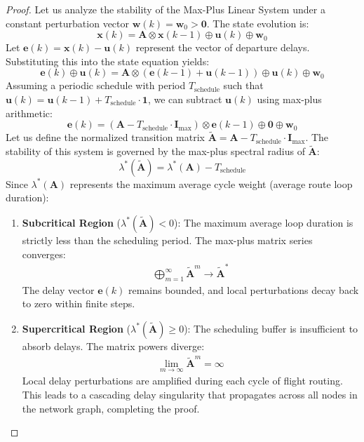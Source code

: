 \documentclass[11pt,a4paper]{book}
\begin{document}
\begin{proof}
Let us analyze the stability of the Max-Plus Linear System under a constant perturbation vector $\mathbf{w}(k) = \mathbf{w}_0 > \mathbf{0}$. The state evolution is:
\begin{equation}
\mathbf{x}(k) = \mathbf{A} \otimes \mathbf{x}(k-1) \oplus \mathbf{u}(k) \oplus \mathbf{w}_0
\end{equation}
Let $\mathbf{e}(k) = \mathbf{x}(k) - \mathbf{u}(k)$ represent the vector of departure delays. Substituting this into the state equation yields:
\begin{equation}
\mathbf{e}(k) \oplus \mathbf{u}(k) = \mathbf{A} \otimes (\mathbf{e}(k-1) + \mathbf{u}(k-1)) \oplus \mathbf{u}(k) \oplus \mathbf{w}_0
\end{equation}
Assuming a periodic schedule with period $T_{\text{schedule}}$ such that $\mathbf{u}(k) = \mathbf{u}(k-1) + T_{\text{schedule}} \cdot \mathbf{1}$, we can subtract $\mathbf{u}(k)$ using max-plus arithmetic:
\begin{equation}
\mathbf{e}(k) = \left( \mathbf{A} - T_{\text{schedule}} \cdot \mathbf{I}_{\max} \right) \otimes \mathbf{e}(k-1) \oplus \mathbf{0} \oplus \mathbf{w}_0
\end{equation}
Let us define the normalized transition matrix $\mathbf{\tilde{A}} = \mathbf{A} - T_{\text{schedule}} \cdot \mathbf{I}_{\max}$. The stability of this system is governed by the max-plus spectral radius of $\mathbf{\tilde{A}}$:
\begin{equation}
\lambda^*(\mathbf{\tilde{A}}) = \lambda^*(\mathbf{A}) - T_{\text{schedule}}
\end{equation}
Since $\lambda^*(\mathbf{A})$ represents the maximum average cycle weight (average route loop duration):
\begin{enumerate}
    \item \textbf{Subcritical Region} ($\lambda^*(\mathbf{\tilde{A}}) < 0$): The maximum average loop duration is strictly less than the scheduling period. The max-plus matrix series converges:
    \begin{align}
    \bigoplus_{m=1}^{\infty} \mathbf{\tilde{A}}^m \rightarrow \mathbf{\tilde{A}}^*
    \end{align}
    The delay vector $\mathbf{e}(k)$ remains bounded, and local perturbations decay back to zero within finite steps.
    \item \textbf{Supercritical Region} ($\lambda^*(\mathbf{\tilde{A}}) \geq 0$): The scheduling buffer is insufficient to absorb delays. The matrix powers diverge:
    \begin{align}
    \lim_{m \rightarrow \infty} \mathbf{\tilde{A}}^m = \infty
    \end{align}
    Local delay perturbations are amplified during each cycle of flight routing. This leads to a cascading delay singularity that propagates across all nodes in the network graph, completing the proof.
\end{enumerate}
\end{proof}
\end{document}
